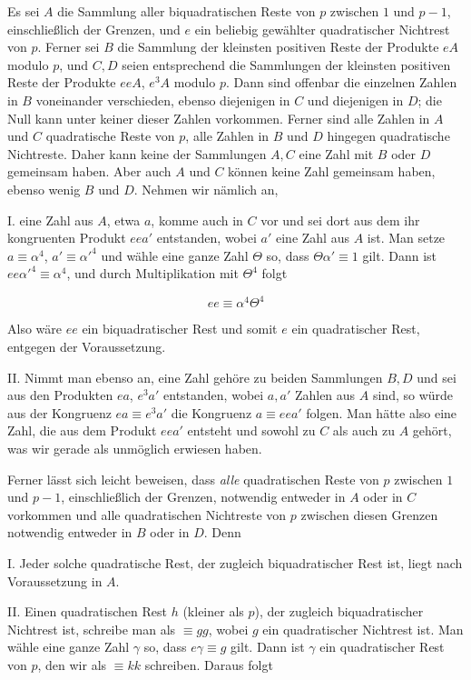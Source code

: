 Es sei $A$ die Sammlung aller biquadratischen Reste von $p$ zwischen $1$ und $p-1$, einschließlich der Grenzen, und $e$ ein beliebig gewählter quadratischer Nichtrest von $p$. Ferner sei $B$ die Sammlung der kleinsten positiven Reste der Produkte $eA$ modulo $p$, und $C,D$ seien entsprechend die Sammlungen der kleinsten positiven Reste der Produkte $eeA$, $e^3A$ modulo $p$. Dann sind offenbar die einzelnen Zahlen in $B$ voneinander verschieden, ebenso diejenigen in $C$ und diejenigen in $D$; die Null kann unter keiner dieser Zahlen vorkommen. Ferner sind alle Zahlen in $A$ und $C$ quadratische Reste von $p$, alle Zahlen in $B$ und $D$ hingegen quadratische Nichtreste. Daher kann keine der Sammlungen $A,C$ eine Zahl mit $B$ oder $D$ gemeinsam haben. Aber auch $A$ und $C$ können keine Zahl gemeinsam haben, ebenso wenig $B$ und $D$. Nehmen wir nämlich an,

I. eine Zahl aus $A$, etwa $a$, komme auch in $C$ vor und sei dort aus dem ihr kongruenten Produkt $eea'$ entstanden, wobei $a'$ eine Zahl aus $A$ ist. Man setze $a\equiv\alpha^4$, $a'\equiv\alpha'^4$ und wähle eine ganze Zahl $\Theta$ so, dass $\Theta\alpha'\equiv1$ gilt. Dann ist $ee\alpha'^4\equiv\alpha^4$, und durch Multiplikation mit $\Theta^4$ folgt

\[
ee\equiv\alpha^4\Theta^4
\]

Also wäre $ee$ ein biquadratischer Rest und somit $e$ ein quadratischer Rest, entgegen der Voraussetzung.

%
II. Nimmt man ebenso an, eine Zahl gehöre zu beiden Sammlungen $B,D$ und sei aus den Produkten $ea$, $e^3a'$ entstanden, wobei $a,a'$ Zahlen aus $A$ sind, so würde aus der Kongruenz $ea\equiv e^3a'$ die Kongruenz $a\equiv eea'$ folgen. Man hätte also eine Zahl, die aus dem Produkt $eea'$ entsteht und sowohl zu $C$ als auch zu $A$ gehört, was wir gerade als unmöglich erwiesen haben.

Ferner lässt sich leicht beweisen, dass \emph{alle} quadratischen Reste von $p$ zwischen $1$ und $p-1$, einschließlich der Grenzen, notwendig entweder in $A$ oder in $C$ vorkommen und alle quadratischen Nichtreste von $p$ zwischen diesen Grenzen notwendig entweder in $B$ oder in $D$. Denn

I. Jeder solche quadratische Rest, der zugleich biquadratischer Rest ist, liegt nach Voraussetzung in $A$.

II. Einen quadratischen Rest $h$ (kleiner als $p$), der zugleich biquadratischer Nichtrest ist, schreibe man als $\equiv gg$, wobei $g$ ein quadratischer Nichtrest ist. Man wähle eine ganze Zahl $\gamma$ so, dass $e\gamma\equiv g$ gilt. Dann ist $\gamma$ ein quadratischer Rest von $p$, den wir als $\equiv kk$ schreiben. Daraus folgt

